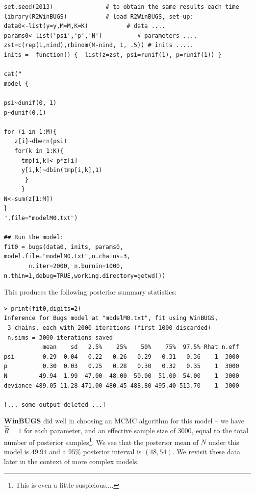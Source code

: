 {\small
\begin{verbatim}
set.seed(2013)               # to obtain the same results each time
library(R2WinBUGS)           # load R2WinBUGS, set-up:
data0<-list(y=y,M=M,K=K)           # data ....
params0<-list('psi','p','N')          # parameters .... 
zst=c(rep(1,nind),rbinom(M-nind, 1, .5)) # inits .....
inits =  function() {  list(z=zst, psi=runif(1), p=runif(1)) }

cat("
model {

psi~dunif(0, 1)
p~dunif(0,1)

for (i in 1:M){
   z[i]~dbern(psi)
   for(k in 1:K){
     tmp[i,k]<-p*z[i]
     y[i,k]~dbin(tmp[i,k],1)
      }
     }
N<-sum(z[1:M])
}
",file="modelM0.txt")

## Run the model:
fit0 = bugs(data0, inits, params0, model.file="modelM0.txt",n.chains=3,
       n.iter=2000, n.burnin=1000, n.thin=1,debug=TRUE,working.directory=getwd())
\end{verbatim}
}
This produces the following posterior
 summary statistics:
{\small
\begin{verbatim}
> print(fit0,digits=2)
Inference for Bugs model at "modelM0.txt", fit using WinBUGS,
 3 chains, each with 2000 iterations (first 1000 discarded)
 n.sims = 3000 iterations saved
           mean    sd   2.5%    25%    50%    75%  97.5% Rhat n.eff
psi        0.29  0.04   0.22   0.26   0.29   0.31   0.36    1  3000
p          0.30  0.03   0.25   0.28   0.30   0.32   0.35    1  3000
N         49.94  1.99  47.00  48.00  50.00  51.00  54.00    1  3000
deviance 489.05 11.28 471.00 480.45 488.80 495.40 513.70    1  3000

[... some output deleted ...]
\end{verbatim}
}
{\bf WinBUGS} did well in choosing an MCMC algorithm for this model --
we have $\hat{R} = 1$ for each parameter, and an effective sample size
of 3000, equal to the total number of posterior samples\footnote{This is even a little
suspicious....}.
We see that the posterior mean of $N$ under this
model is $49.94$ and a 95\% posterior interval is $(48,54)$.  We
revisit these data later in the context of more complex models.

